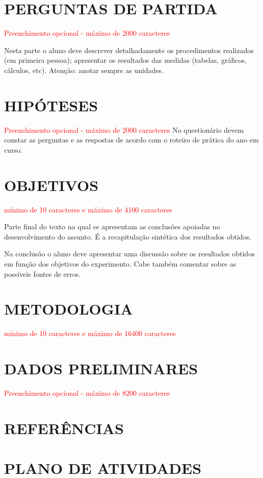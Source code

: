 \section{\MakeUppercase{Perguntas de partida}}

\textcolor{red}{Preenchimento opcional - máximo de 2000 caracteres}

Nesta parte o aluno deve descrever detalhadamente os procedimentos realizados (em primeira pessoa); apresentar os resultados das medidas (tabelas, gráficos, cálculos, etc). Atenção: anotar sempre as unidades.


\section{\MakeUppercase{Hipóteses}}

\textcolor{red}{Preenchimento opcional - máximo de 2000 caracteres}
No questionário devem constar as perguntas e as respostas de acordo com o roteiro de prática do ano em curso. 


\section{\MakeUppercase{Objetivos}}

\textcolor{red}{mínimo de 10 caracteres e máximo de 4100 caracteres}

Parte final do texto na qual se apresentam as conclusões apoiadas no desenvolvimento do assunto. É a recapitulação sintética dos resultados obtidos. 

Na conclusão o aluno deve apresentar uma discussão sobre os resultados obtidos em função dos objetivos do experimento. Cabe também comentar sobre as possíveis fontes de erros. \cite{alvares2017retrofitting}

\cite{hosseinzadeh2021improving}

\section{\MakeUppercase{Metodologia}}

\textcolor{red}{mínimo de 10 caracteres e máximo de 16400 caracteres}

\section{\MakeUppercase{Dados preliminares}}

\textcolor{red}{Preenchimento opcional - máximo de 8200 caracteres}

\newpage

\section{\MakeUppercase{Referências}}

\renewcommand\refname{}




\newpage

\section{\MakeUppercase{Plano de atividades}}




